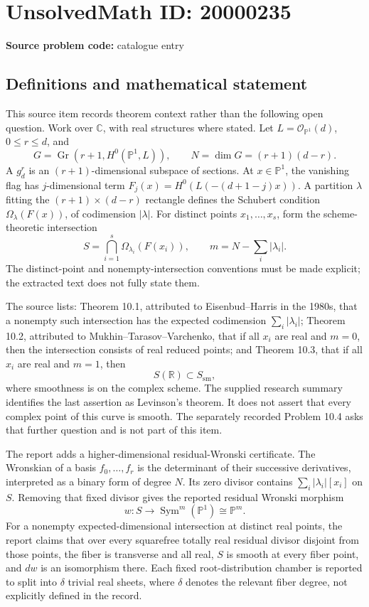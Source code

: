 \documentclass[11pt]{article}
\newcommand{\R}{\mathbb{R}}
\newcommand{\C}{\mathbb{C}}
\newcommand{\PP}{\mathbb{P}}
\begin{document}
\section*{UnsolvedMath ID: 20000235}
\textbf{Source problem code:} catalogue entry
\subsection{Definitions and mathematical statement}
This source item records theorem context rather than the following open question. Work over $\C$, with real structures where stated. Let $L=\mathcal O_{\PP^1}(d)$, $0\leq r\leq d$, and
\[
 G=\operatorname{Gr}(r+1,H^0(\PP^1,L)),\qquad N=\dim G=(r+1)(d-r).
\]
A $g^r_d$ is an $(r+1)$-dimensional subspace of sections. At $x\in\PP^1$, the vanishing flag has $j$-dimensional term $F_j(x)=H^0(L(-(d+1-j)x))$. A partition $\lambda$ fitting the $(r+1)\times(d-r)$ rectangle defines the Schubert condition $\Omega_\lambda(F(x))$, of codimension $|\lambda|$. For distinct points $x_1,\ldots,x_s$, form the scheme-theoretic intersection
\[
 S=\bigcap_{i=1}^s\Omega_{\lambda_i}(F(x_i)),\qquad
 m=N-\sum_i|\lambda_i|.
\]
The distinct-point and nonempty-intersection conventions must be made explicit; the extracted text does not fully state them.

The source lists: Theorem 10.1, attributed to Eisenbud--Harris in the 1980s, that a nonempty such intersection has the expected codimension $\sum_i|\lambda_i|$; Theorem 10.2, attributed to Mukhin--Tarasov--Varchenko, that if all $x_i$ are real and $m=0$, then the intersection consists of real reduced points; and Theorem 10.3, that if all $x_i$ are real and $m=1$, then
\[
 S(\R)\subset S_{\mathrm{sm}},
\]
where smoothness is on the complex scheme. The supplied research summary identifies the last assertion as Levinson's theorem. It does not assert that every complex point of this curve is smooth. The separately recorded Problem 10.4 asks that further question and is not part of this item.

The report adds a higher-dimensional residual-Wronski certificate. The Wronskian of a basis $f_0,\ldots,f_r$ is the determinant of their successive derivatives, interpreted as a binary form of degree $N$. Its zero divisor contains $\sum_i|\lambda_i|[x_i]$ on $S$. Removing that fixed divisor gives the reported residual Wronski morphism
\[
 w:S\longrightarrow\operatorname{Sym}^m(\PP^1)\cong\PP^m.
\]
For a nonempty expected-dimensional intersection at distinct real points, the report claims that over every squarefree totally real residual divisor disjoint from those points, the fiber is transverse and all real, $S$ is smooth at every fiber point, and $dw$ is an isomorphism there. Each fixed root-distribution chamber is reported to split into $\delta$ trivial real sheets, where $\delta$ denotes the relevant fiber degree, not explicitly defined in the record.
\end{document}
